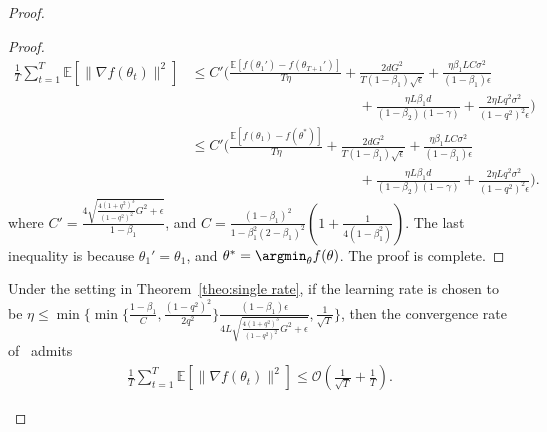 \documentclass[11pt]{article}
\begin{document}
\begin{proof}
\begin{proof}
\begin{align*}
    \frac{1}{T}\sum_{t=1}^T \mathbb E[\|\nabla f(\theta_t)\|^2]&\leq C'\Big(\frac{\mathbb E[f(\theta_1')-f(\theta_{T+1}')]}{T\eta}+\frac{2dG^2}{T(1-\beta_1)\sqrt\epsilon}+\frac{\eta\beta_1 LC\sigma^2}{(1-\beta_1)\epsilon}\\
    &\hspace{2in} +\frac{\eta L\beta_1 d}{(1-\beta_2)(1-\gamma)}+\frac{2\eta L q^2\sigma^2}{(1-q^2)^2\epsilon}\Big)\\
    &\leq C'\Big(\frac{\mathbb E[f(\theta_1)-f(\theta^*)]}{T\eta}+\frac{2dG^2}{T(1-\beta_1)\sqrt\epsilon}+\frac{\eta \beta_1 LC\sigma^2}{(1-\beta_1)\epsilon}\\
    &\hspace{2in} +\frac{\eta L\beta_1 d}{(1-\beta_2)(1-\gamma)}+\frac{2\eta L q^2\sigma^2}{(1-q^2)^2\epsilon}\Big).
\end{align*}
where $C'=\frac{4\sqrt{\frac{4(1+q^2)^3}{(1-q^2)^2}G^2+\epsilon}}{1-\beta_1}$, and $C=\frac{(1-\beta_1)^2}{1-\beta_1^2(2-\beta_1)^2}(1+\frac{1}{4(1-\beta_1^2)})$. The last inequality is because $\theta_1'=\theta_1$, and $\theta^*=\argmin_\theta f(\theta)$. The proof is complete.

\end{proof}

\begin{Corollary} \label{coro:single rate}
Under the setting in Theorem~\ref{theo:single rate}, if the learning rate is chosen to be $\eta\leq \min\{\min\{\frac{1-\beta_1}{C},\frac{(1-q^2)^2}{2q^2}\}\frac{(1-\beta_1)\epsilon}{4L\sqrt{\frac{4(1+q^2)^3}{(1-q^2)^2}G^2+\epsilon}}, \frac{1}{\sqrt T}\}$, then the convergence rate of \algo\ admits
\begin{align*}
    \frac{1}{T}\sum_{t=1}^T \mathbb E[\|\nabla f(\theta_t)\|^2]\leq \mathcal O(\frac{1}{\sqrt T}+\frac{1}{T}).
\end{align*}
\end{Corollary}




\end{proof}
\end{document}
